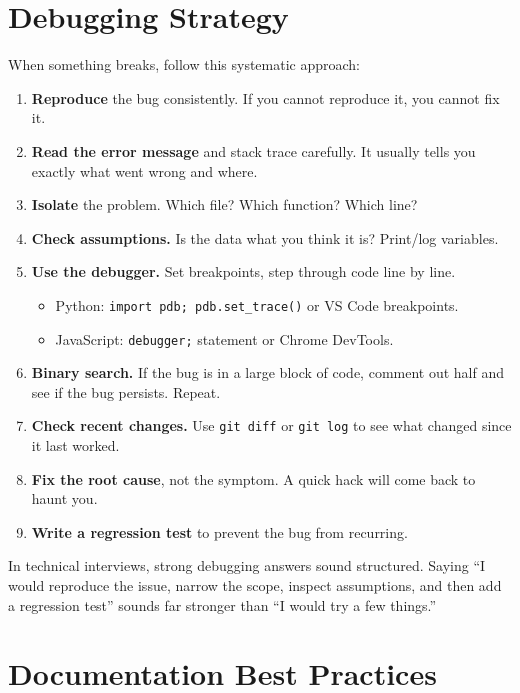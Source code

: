 \documentclass[12pt, a4paper, oneside]{book}
\begin{document}
\section{Debugging Strategy}

When something breaks, follow this systematic approach:

\begin{enumerate}[leftmargin=2em]
    \item \textbf{Reproduce} the bug consistently. If you cannot reproduce it, you cannot fix it.
    \item \textbf{Read the error message} and stack trace carefully. It usually tells you exactly what went wrong and where.
    \item \textbf{Isolate} the problem. Which file? Which function? Which line?
    \item \textbf{Check assumptions.} Is the data what you think it is? Print/log variables.
    \item \textbf{Use the debugger.} Set breakpoints, step through code line by line.
    \begin{itemize}
        \item Python: \texttt{import pdb; pdb.set\_trace()} or VS Code breakpoints.
        \item JavaScript: \texttt{debugger;} statement or Chrome DevTools.
    \end{itemize}
    \item \textbf{Binary search.} If the bug is in a large block of code, comment out half and see if the bug persists. Repeat.
    \item \textbf{Check recent changes.} Use \texttt{git diff} or \texttt{git log} to see what changed since it last worked.
    \item \textbf{Fix the root cause}, not the symptom. A quick hack will come back to haunt you.
    \item \textbf{Write a regression test} to prevent the bug from recurring.
\end{enumerate}

\begin{examtipbox}
In technical interviews, strong debugging answers sound structured. Saying ``I would reproduce the issue, narrow the scope, inspect assumptions, and then add a regression test'' sounds far stronger than ``I would try a few things.''
\end{examtipbox}

\section{Documentation Best Practices}
\end{document}
